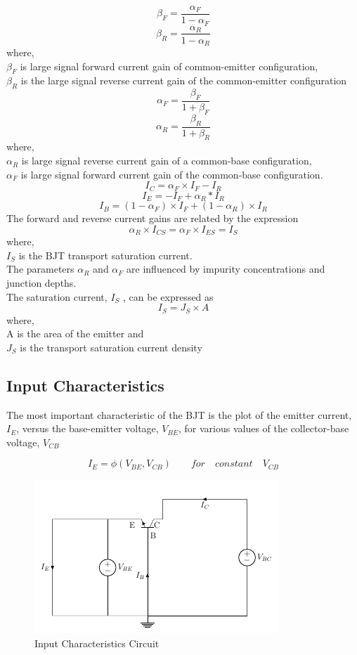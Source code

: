 			$$\beta_F = \frac{\alpha_F}{1 - \alpha_F}$$ $$\beta_R= \frac{\alpha_R}{1 - \alpha_R}$$
			where,\\
			\(\beta_F\) is large signal forward current gain of common-emitter configuration,\\
			\(\beta_R\) is the large signal reverse current gain of the common-emitter configuration
			$$ \alpha_F=\frac{\beta_F}{1 + \beta_F}$$
			$$\alpha_R=\frac{\beta_R}{1 + \beta_R}$$
			where,\\
			\(\alpha_R\) is large signal reverse current gain of a common-base configuration,\\
			\(\alpha_F\) is large signal forward current gain of the common-base configuration.
			$$I_C = \alpha_F \times I_F - I_R$$
			$$ I_E = -I_F + \alpha_R * I_R$$
			$$ I_B = (1 - \alpha_F) \times I_F + (1 - \alpha_R) \times I_R$$
			The forward and reverse current gains are related by the expression
			$$ \alpha_R \times I_{CS}=\alpha_F \times I_{ ES} =I_S$$
			where,\\
			\(I_S\) is the BJT transport saturation current.\\
			The parameters \(\alpha_R\) and \(\alpha_F\) are influenced by impurity concentrations and junction depths.\\
			The saturation current, \(I_S\) , can be expressed as
			$$ I_S = J_S \times A$$
			where,\\
			A is the area of the emitter and\\
			\(J_S\) is the transport saturation current density
			
		\subsection{Input Characteristics}
			The most important characteristic of the BJT is the plot of the emitter current, $I_E$, versus the base-emitter voltage, $V_{BE}$, for various values of the collector-base voltage, $V_{CB}$			
			
			$$I_E=\phi (V_{BE},V_{CB}) \qquad for \quad constant \quad V_{CB}$$
			
			\begin{figure}[h]
				\centering
				\includegraphics[width=0.7\linewidth]{img/exp10/4}
				\caption{Input Characteristics Circuit}
				\label{fig:bjt2_char_circuit}
			\end{figure}
		
